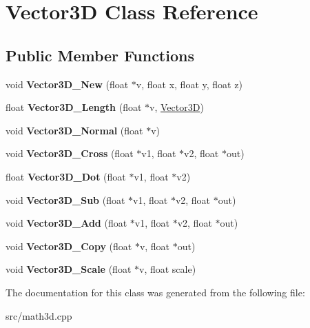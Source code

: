 \hypertarget{classVector3D}{}\section{Vector3D Class Reference}
\label{classVector3D}
\subsection*{Public Member Functions}
\begin{DoxyCompactItemize}
\item 
\mbox{\label{classVector3D_ab649d37e6c49fc81b67e0e104e3fbdb3}} 
void {\bfseries Vector3\+D\+\_\+\+New} (float $\ast$v, float x, float y, float z)
\item 
\mbox{\label{classVector3D_a0feb8577b8de1ba0a8873ffb90b56646}} 
float {\bfseries Vector3\+D\+\_\+\+Length} (float $\ast$v, \hyperlink{classVector3D}{Vector3D})
\item 
\mbox{\label{classVector3D_ac7b79a69d83e9b63ac6cc89393ab91db}} 
void {\bfseries Vector3\+D\+\_\+\+Normal} (float $\ast$v)
\item 
\mbox{\label{classVector3D_aeaf78a85869d49e443d87ad2d2f734fd}} 
void {\bfseries Vector3\+D\+\_\+\+Cross} (float $\ast$v1, float $\ast$v2, float $\ast$out)
\item 
\mbox{\label{classVector3D_a86b58f3dedde9b9a2fd99d0bb53c5d32}} 
float {\bfseries Vector3\+D\+\_\+\+Dot} (float $\ast$v1, float $\ast$v2)
\item 
\mbox{\label{classVector3D_a5c5d81575af8f23b1f9f5ae733ccce9c}} 
void {\bfseries Vector3\+D\+\_\+\+Sub} (float $\ast$v1, float $\ast$v2, float $\ast$out)
\item 
\mbox{\label{classVector3D_a42cd1d656e8c275feef11637c95ce2bb}} 
void {\bfseries Vector3\+D\+\_\+\+Add} (float $\ast$v1, float $\ast$v2, float $\ast$out)
\item 
\mbox{\label{classVector3D_aef55928129889c9ac2ae8814927d8405}} 
void {\bfseries Vector3\+D\+\_\+\+Copy} (float $\ast$v, float $\ast$out)
\item 
\mbox{\label{classVector3D_a87a11ede87382a04d51ac7fe048e9252}} 
void {\bfseries Vector3\+D\+\_\+\+Scale} (float $\ast$v, float scale)
\end{DoxyCompactItemize}


The documentation for this class was generated from the following file\+:\begin{DoxyCompactItemize}
\item 
src/math3d.\+cpp\end{DoxyCompactItemize}
